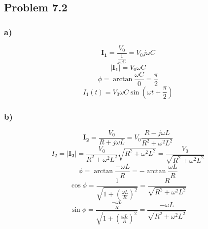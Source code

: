\documentclass[../homework.tex]{subfiles}
\begin{document}
\subsection{Problem 7.2}

\subsubsection*{a)}
\begin{equation*}
    \mathbf{I_1} = \frac{V_0}{\frac{1}{j \omega C}} = V_0 j \omega C
\end{equation*}
\begin{equation*}
    |\mathbf{I_1}| = V_0 \omega C
\end{equation*}
\begin{equation*}
    \phi = \arctan \frac{\omega C}{0} = \frac{\pi}{2}
\end{equation*}
\begin{equation*}
    I_1(t) = V_0 \omega C \sin{\left(\omega t + \frac{\pi}{2}\right)}
\end{equation*}

\subsubsection*{b)}
\begin{equation*}
    \mathbf{I_2} = \frac{V_0}{R + j \omega L} = V_0 \frac{R - j \omega L}{R^2 + \omega^2 L^2}
\end{equation*}
\begin{equation*}
    I_2 = |\mathbf{I_2}| = \frac{V_0}{R^2 + \omega^2 L^2} \sqrt{R^2 + \omega^2 L^2} = \frac{V_0}{\sqrt{R^2 + \omega^2 L^2}}
\end{equation*}
\begin{equation*}
    \phi = \arctan{\frac{-\omega L}{R}} = -\arctan{\frac{\omega L}{R}}
\end{equation*}
\begin{equation*}
    \cos{\phi} = \frac{1}{\sqrt{1 + \left(\frac{\omega L}{R}\right)^2}} = \frac{R}{\sqrt{R^2 + \omega^2 L^2}}
\end{equation*}
\begin{equation*}
    \sin{\phi} = \frac{\frac{-\omega L}{R}}{\sqrt{1 + \left(\frac{\omega L}{R}\right)^2}} = \frac{-\omega L}{\sqrt{R^2 + \omega^2 L^2}}
\end{equation*}
\end{document}
